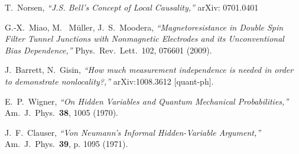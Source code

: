 \documentclass{svjour2}                    %
\begin{document}
\begin{thebibliography}{}
 T.~Norsen, {\it ``J.S. Bell's Concept of Local Causality,''} arXiv: 0701.0401

 G.-X.~Miao, M.~ M\"uller, J.~S.~Moodera, {\it ``Magnetoresistance in Double Spin Filter Tunnel Junctions with Nonmagnetic Electrodes and its Unconventional Bias Dependence,''}
Phys.\ Rev.\ Lett.\ 102, 076601 (2009).

 J.~Barrett, N.~Gisin, {\it ``How much measurement independence is needed in order to demonstrate nonlocality?,''} arXiv:1008.3612 [quant-ph].

  E.~P.~Wigner,
  {\it ``On Hidden Variables and Quantum Mechanical Probabilities,''} Am.\ J.\ Phys.\ {\bf 38}, 1005 (1970).
  
 J.~F.~Clauser, {\it ``Von Neumann's Informal Hidden-Variable Argument,''} Am.\ J.\ Phys.\ {\bf 39}, p. 1095 (1971).

\end{thebibliography}
\end{document}
